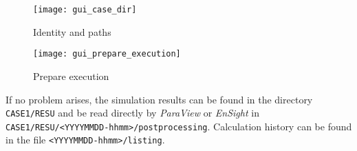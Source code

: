 \begin{figure}[!ht]
\begin{center}
\texttt{[image: gui\_case\_dir]}
\caption{Identity and paths}
\label{fig:3_e1}
\end{center}
\end{figure}

\begin{figure}[!ht]
\begin{center}
\texttt{[image: gui\_prepare\_execution]}
\caption{Prepare execution}
\label{fig:43_e1}
\end{center}
\end{figure}

If no problem arises, the simulation results can be found in the directory \texttt{CASE1/RESU} and be read directly by {\em ParaView} or {\em EnSight} in \texttt{CASE1/RESU/<YYYYMMDD-hhmm>/postprocessing}. Calculation history can be found in the file \texttt{<YYYYMMDD-hhmm>/listing}.

